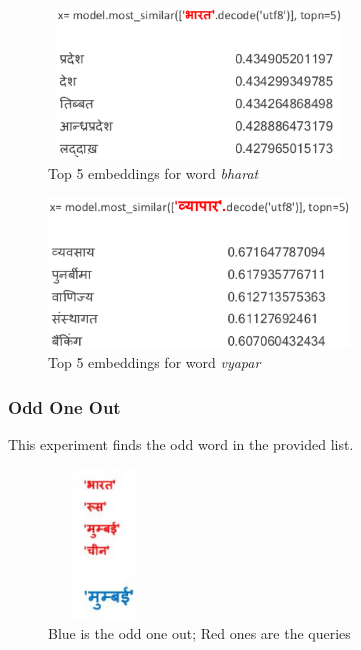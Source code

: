 \documentclass{article}
\begin{document}
\begin{figure}[h!tb]
\centering
\includegraphics[width=8cm,height=4cm]{3.eps}
\caption {Top 5 embeddings for word \emph{bharat}}
\end{figure}

\begin{figure}[h!tb]
\centering
\includegraphics[width=8cm,height=4cm]{4.eps}
\caption {Top 5 embeddings for word \emph{vyapar}}
\end{figure}

\subsubsection{Odd One Out}
This experiment finds the odd word in the provided list.
\begin{figure}[h!tb]
\centering
\includegraphics[width=3cm,height=4cm]{2.eps}
\caption {Blue is the odd one out; Red ones are the queries}
\end{figure}
\newpage
\end{document}
